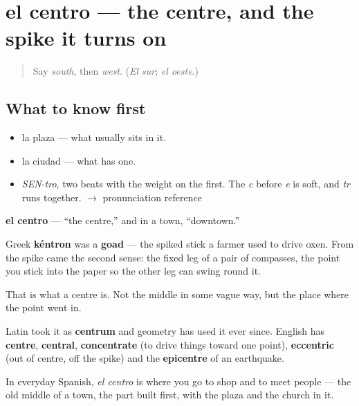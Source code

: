 \section[el centro]{el centro — the centre, and the spike it turns on}

\label{lesson:ES-C347-centro}



\begin{quote}
Say \emph{south}, then \emph{west}. (\emph{El sur}; \emph{el oeste}.)
\end{quote}

\subsection*{What to know first}
\begin{itemize}
\raggedright
  \item la plaza — what usually sits in it.
  \item la ciudad — what has one.
\end{itemize}

\begin{sounds}
\begin{itemize}
\raggedright
  \item \emph{SEN-tro}, two beats with the weight on the first. The \emph{c} before \emph{e} is soft, and \emph{tr} runs together. $\to$ pronunciation reference
\end{itemize}
\end{sounds}

\begin{cousinweb}
\textbf{el centro} — \textquotedblleft{}the centre,\textquotedblright{} and in a town, \textquotedblleft{}downtown.\textquotedblright{}

Greek \textbf{kéntron} was a \textbf{goad} — the spiked stick a farmer used to drive oxen. From the spike came the second sense: the fixed leg of a pair of compasses, the point you stick into the paper so the other leg can swing round it.

That is what a centre is. Not the middle in some vague way, but the place where the point went in.

Latin took it as \textbf{centrum} and geometry has used it ever since. English has \textbf{centre}, \textbf{central}, \textbf{concentrate} (to drive things toward one point), \textbf{eccentric} (out of centre, off the spike) and the \textbf{epicentre} of an earthquake.

In everyday Spanish, \emph{el centro} is where you go to shop and to meet people — the old middle of a town, the part built first, with the plaza and the church in it.
\end{cousinweb}

